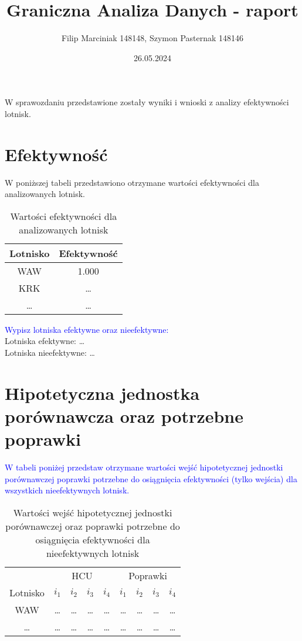 \documentclass[a4paper,12pt]{article}
\author{{Filip Marciniak 148148, Szymon Pasternak 148146}}
\date{{26.05.2024}}
\title{Graniczna Analiza Danych - raport}
\begin{document}
\maketitle

W sprawozdaniu przedstawione zostały wyniki i wnioski z analizy efektywności lotnisk.

\section{Efektywność}

W poniższej tabeli przedstawiono otrzymane wartości efektywności dla analizowanych lotnisk.
\begin{table}[H]
    \centering
    \begin{tabular}{c|c}
    \hline
         Lotnisko & Efektywność  \\ \hline
         WAW & 1.000 \\
         KRK & \ldots \\
         \ldots & \ldots \\
         \hline
    \end{tabular}
    \caption{Wartości efektywności dla analizowanych lotnisk}
    \label{tab:airports-efficiency}
\end{table}

\noindent \textcolor{blue}{Wypisz lotniska efektywne oraz nieefektywne:} \\
Lotniska efektywne: \ldots \\
Lotniska nieefektywne: \ldots

\section{Hipotetyczna jednostka porównawcza oraz potrzebne poprawki}

\textcolor{blue}{W tabeli poniżej przedstaw otrzymane wartości wejść hipotetycznej jednostki porównawczej poprawki potrzebne do osiągnięcia efektywności (tylko wejścia) dla wszystkich nieefektywnych lotnisk.}

\begin{table}[H]
    \centering
    \begin{tabular}{c|cccc|cccc}
    \hline
        & \multicolumn{4}{c|}{HCU} & \multicolumn{4}{c}{Poprawki}  \\
         Lotnisko & $i_1$ & $i_2$ & $i_3$ & $i_4$ & $i_1$ & $i_2$ & $i_3$ & $i_4$ \\ \hline
         WAW & \ldots & \ldots & \ldots & \ldots & \ldots & \ldots & \ldots & \ldots \\
         \ldots & \ldots & \ldots & \ldots & \ldots & \ldots & \ldots & \ldots & \ldots \\
    \end{tabular}
    \caption{Wartości wejść hipotetycznej jednostki porównawczej oraz poprawki potrzebne do osiągnięcia efektywności dla nieefektywnych lotnisk }
    \label{tab:airports-hcu-and-improvements}
\end{table}
\end{document}
